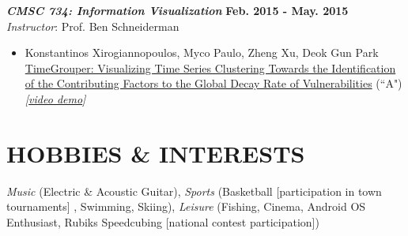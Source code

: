 \documentclass[margin, 10pt]{res} %
\begin{document}
\begin{resume}
{\sl \textbf{CMSC 734: Information Visualization}} \hfill \textbf{Feb. 2015 - May. 2015}\\
\textit{Instructor}: Prof. Ben Schneiderman\\
\begin{itemize}
  \item Konstantinos Xirogiannopoulos, Myco Paulo, Zheng Xu, Deok Gun Park\\
  \href{https://wiki.cs.umd.edu/cmsc734_s15/images/f/fc/TimeGrouper_FinalReport.pdf}{TimeGrouper: Visualizing Time Series Clustering Towards the Identification of the Contributing Factors to the Global Decay Rate of Vulnerabilities} (``A") \\
  \textit{[\href{https://www.youtube.com/watch?v=oDgl6pp1CVU}{video demo}]}
\end{itemize}



\section{HOBBIES \& INTERESTS}

\textit{Music} (Electric \& Acoustic Guitar), \textit{Sports} (Basketball [participation in town tournaments] , Swimming, Skiing), \textit{Leisure} (Fishing, Cinema, Android OS Enthusiast, Rubiks Speedcubing [national contest participation])


\end{resume}
\end{document}
